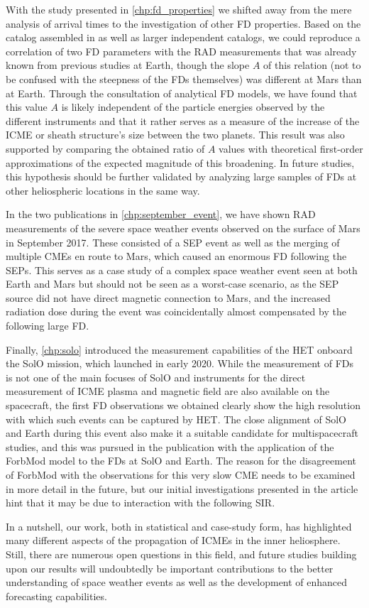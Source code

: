 With the study presented in \autoref{chp:fd_properties} we shifted away from the mere analysis of arrival times to the investigation of other \ac{FD} properties. Based on the catalog assembled in \citet{Forstner-2019} as well as larger independent catalogs, we could reproduce a correlation of two \ac{FD} parameters with the \ac{RAD} measurements that was already known from previous studies at Earth, though the slope $A$ of this relation (not to be confused with the steepness of the \acp{FD} themselves) was different at Mars than at Earth. Through the consultation of analytical \ac{FD} models, we have found that this value $A$ is likely independent of the particle energies observed by the different instruments and that it rather serves as a measure of the increase of the \ac{ICME} or sheath structure's size between the two planets. This result was also supported by comparing the obtained ratio of $A$ values with theoretical first-order approximations of the expected magnitude of this broadening. In future studies, this hypothesis should be further validated by analyzing large samples of \acp{FD} at other heliospheric locations in the same way.

In the two publications in \autoref{chp:september_event}, we have shown \ac{RAD} measurements of the severe space weather events observed on the surface of Mars in September 2017. These consisted of a \ac{SEP} event as well as the merging of multiple \acp{CME} en route to Mars, which caused an enormous \ac{FD} following the \acp{SEP}. This serves as a case study of a complex space weather event seen at both Earth and Mars but should not be seen as a worst-case scenario, as the \ac{SEP} source did not have direct magnetic connection to Mars, and the increased radiation dose during the event was coincidentally almost compensated by the following large \ac{FD}.

Finally, \autoref{chp:solo} introduced the measurement capabilities of the \ac{HET} onboard the \ac{SolO} mission, which launched in early 2020. While the measurement of \acp{FD} is not one of the main focuses of \ac{SolO} and instruments for the direct measurement of \ac{ICME} plasma and magnetic field are also available on the spacecraft, the first \ac{FD} observations we obtained clearly show the high resolution with which such events can be captured by \ac{HET}. The close alignment of \ac{SolO} and Earth during this event also make it a suitable candidate for multispacecraft studies, and this was pursued in the publication with the application of the \acs{ForbMod} model to the \acp{FD} at \ac{SolO} and Earth. The reason for the disagreement of \acs{ForbMod} with the observations for this very slow \ac{CME} needs to be examined in more detail in the future, but our initial investigations presented in the article hint that it may be due to interaction with the following \acl{SIR}.

In a nutshell, our work, both in statistical and case-study form, has highlighted many different aspects of the propagation of \acp{ICME} in the inner heliosphere. Still, there are numerous open questions in this field, and future studies building upon our results will undoubtedly be important contributions to the better understanding of space weather events as well as the development of enhanced forecasting capabilities.